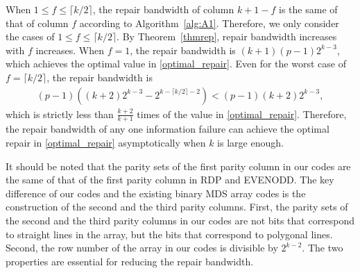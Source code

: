 \documentclass[conference]{IEEEtran}
\begin{document}
When $1\leq f\leq \lceil k/2 \rceil$, the repair bandwidth of column $k+1-f$ is the same of that of column $f$ according to Algorithm~\ref{alg:A1}. Therefore, we only consider the cases of $1\leq f\leq \lceil k/2 \rceil$.
By Theorem~\ref{thmrep}, repair bandwidth increases with $f$ increases.
When $f=1$, the repair bandwidth is $(k+1)(p-1)2^{k-3}$, which achieves the optimal value in \eqref{optimal_repair}. Even for the worst case of $f=\lceil k/2\rceil$, the repair bandwidth is
\begin{align*}
(p-1)((k+2)2^{k-3}-2^{k-\lceil k/2\rceil-2})< (p-1)(k+2)2^{k-3},
\end{align*}
which is strictly less than $\frac{k+2}{k+1}$ times of the value in \eqref{optimal_repair}. Therefore, the repair bandwidth of any one information failure can achieve the optimal repair in \eqref{optimal_repair} asymptotically when $k$ is large enough.

It should be noted that the parity sets of the first parity column in our codes are the same of that of the first parity column in RDP and EVENODD. The key difference of our codes and the existing binary MDS array codes is the construction of the second and the third parity columns. First, the parity sets of the second and the third parity columns in our codes are not bits that correspond to straight lines in the array, but the bits that correspond to polygonal lines. Second, the row number of the array in our codes is divisible by $2^{k-2}$. The two properties are essential for reducing the repair bandwidth.
\end{document}
